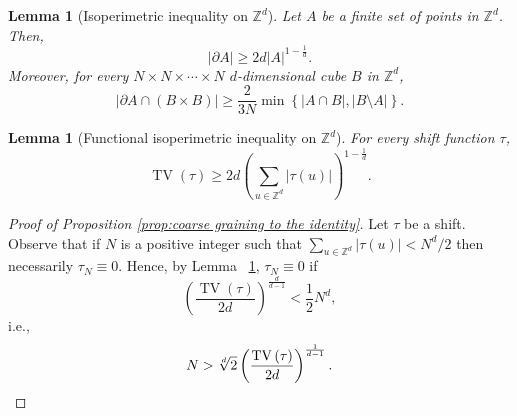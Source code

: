\documentclass[11pt, reqno]{amsart}
\newtheorem{lemma}[theorem]{Lemma}
\newcommand{\Z}{\mathbb{Z}}
\DeclareMathOperator{\TV}{TV}
\numberwithin{equation}{section}
\begin{document}
\begin{lemma}[Isoperimetric inequality on ${\mathbb Z}^d$]\label{lem:isoperimetric inequality}
Let $A$ be a finite set of points in ${\mathbb Z}^d$.
Then,
\begin{equation}\label{eq:bdry_small}
\lvert  \partial A\rvert \geq 2d\lvert  A \rvert ^{1-\frac{1}{d}}.    
\end{equation}
Moreover, for 
every $N\times N\times\cdots\times N$ $d$-dimensional cube $B$ in $\mathbb Z^d$, 
\begin{equation}\label{eq:bdry_rough}
\lvert  \partial A\cap(B\times B)\rvert 
\geq \frac{2}{3N}\min\left\{\lvert A\cap B\rvert ,\lvert B\setminus A\rvert \right\}.
\end{equation}
\end{lemma}
\begin{lemma}[Functional isoperimetric inequality on $\Z^d$]\label{lem:functional_isoperimetry}
For every shift function $\tau$,
\begin{equation*}
\TV(\tau) \geq 2d  \left( \sum_{u\in \Z^d}|\tau(u)| \right) ^{1-\frac{1}{d}}.
\end{equation*}
\end{lemma}

\begin{proof}[Proof of Proposition \ref{prop:coarse graining to the identity}]
Let $\tau$ be a shift. 
Observe that if $N$ is a positive integer such that $\sum_{u\in \Z^{d}}|\tau(u)| < N^d/2$ then necessarily $\tau_N\equiv 0$.
Hence, by Lemma
~\ref{lem:functional_isoperimetry}, $\tau_N\equiv 0$ if 
\begin{equation*}
\left( \frac{\TV(\tau)}{2d} \right)^{\frac{d}{d-1}}<\frac{1}{2}N^d,
\end{equation*}
i.e.,  
\begin{equation*}
N>\sqrt[d]{2}\left(\frac{\TV\left(\tau\right)}{2d}\right)^{\frac{1}{d-1}}.\qedhere\end{equation*}
\end{proof}
\end{document}
